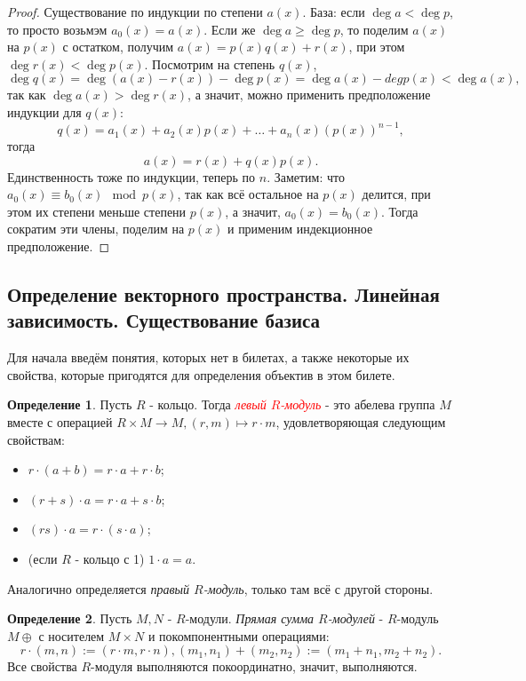 \documentclass[a4paper,100pt]{article}
\theoremstyle{indented}
\theoremstyle{definition}
\newtheorem{defn}{Определение}
\theoremstyle{remark}
\begin{document}
\begin{proof}
    Существование по индукции по степени $a(x)$. База: если $\deg a<\deg p$, то просто возьмэм $a_0(x)=a(x)$. Если же $\deg a \geq \deg p$, то поделим $a(x)$ на $p(x)$ с остатком, получим $a(x)=p(x)q(x)+r(x)$, при этом $\deg r(x)<\deg p(x)$. Посмотрим на степень $q(x)$, 
    \[
        \deg q(x)=\deg(a(x)-r(x))-\deg p(x)=\deg a(x ) -deg p(x) < \deg a(x), 
    \]
    так как $\deg a(x)>\deg r(x)$, а значит, можно применить предположение индукции для $q(x)$:
    \[
        q(x)=a_1(x)+a_2(x)p(x)+\dots+a_n(x)(p(x))^{n-1}, 
    \]
    тогда
    \[
        a(x)=r(x)+q(x)p(x).
    \]
    Единственность тоже по индукции, теперь по $n$. Заметим: что $a_0(x)\equiv b_0(x)\mod p(x)$, так как всё остальное на $p(x)$ делится, при этом их степени меньше степени $p(x)$, а значит, $a_0(x)=b_0(x)$. Тогда сократим эти члены, поделим на $p(x)$ и применим индекционное предположение. 
\end{proof}

\resetall

\subsection{Определение векторного пространства. Линейная зависимость. Существование базиса}

Для начала введём понятия, которых нет в билетах, а также некоторые их свойства, которые пригодятся для определения объектив в этом билете.

\begin{defn}
    Пусть $R$ - кольцо. Тогда \hypertarget{n42}{\textcolor{red}{\textit{левый $R$-модуль}}} - это абелева группа $M$ вместе с операцией $R\times M\rightarrow M, (r, m)\mapsto r\cdot m$, удовлетворяющая следующим свойствам:\
    
    \begin{itemize}
        \item $r\cdot(a+b)=r\cdot a+r\cdot b$;
        \item $(r+s)\cdot a=r\cdot a+s\cdot b$;
        \item $(rs)\cdot a=r\cdot(s\cdot a)$;
        \item (если $R$ - кольцо с 1) $1\cdot a=a$.
    \end{itemize}

    Аналогично определяется \textit{правый $R$-модуль}, только там всё с другой стороны.
\end{defn}

\begin{defn}
    Пусть $M, N$ - $R$-модули. \textit{Прямая сумма $R$-модулей} - $R$-модуль $M\oplus$ с носителем $M\times N$ и покомпонентными операциями:
    \[
        r\cdot (m,n):=(r\cdot m, r\cdot n), (m_1, n_1)+(m_2, n_2):=(m_1+n_1, m_2+n_2).
    \]
    Все свойства $R$-модуля выполняются покоординатно, значит, выполняются.
\end{defn}
\end{document}

